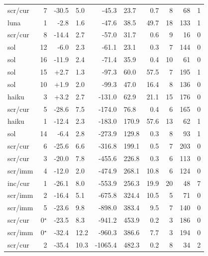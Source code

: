 \documentclass[11pt]{article}
\newcommand{\better}[1]{\textcolor{green!50!black}{#1}}
\newcommand{\worse}[1]{\textcolor{red!75!black}{#1}}
\begin{document}
\begin{table}
\begin{tabular}{l r r@{\,$\pm$\,}l r@{\,$\pm$\,}l r r r r}
scr/cur & 7 & \worse{-30.5} & \worse{5.0} & -45.3 & 23.7 & 0.7 & 8 & 68 & 1 \\
luna & 1 & -2.8 & 1.6 & -47.6 & 38.5 & 49.7 & 18 & 133 & 1 \\
scr/cur & 8 & \worse{-14.4} & \worse{2.7} & -57.0 & 31.7 & 0.6 & 9 & 16 & 0 \\
sol & 12 & \worse{-6.0} & \worse{2.3} & \worse{-61.1} & \worse{23.1} & 0.3 & 7 & 144 & 0 \\
sol & 16 & \worse{-11.9} & \worse{2.4} & -71.4 & 35.9 & 0.4 & 10 & 61 & 0 \\
sol & 15 & \better{+2.7} & \better{1.3} & -97.3 & 60.0 & 57.5 & 7 & 195 & 1 \\
sol & 10 & +1.9 & 2.0 & \worse{-99.3} & \worse{47.0} & 16.4 & 8 & 136 & 0 \\
haiku & 3 & +3.2 & 2.7 & \worse{-131.0} & \worse{62.9} & 21.1 & 15 & 176 & 0 \\
scr/cur & 5 & \worse{-28.6} & \worse{7.5} & \worse{-174.0} & \worse{76.8} & 0.4 & 6 & 165 & 0 \\
haiku & 1 & \worse{-12.4} & \worse{2.3} & -183.0 & 170.9 & 57.6 & 13 & 62 & 1 \\
sol & 14 & \worse{-6.4} & \worse{2.8} & \worse{-273.9} & \worse{129.8} & 0.3 & 8 & 93 & 1 \\
scr/cur & 6 & \worse{-25.6} & \worse{6.6} & -316.8 & 199.1 & 0.5 & 7 & 203 & 0 \\
scr/cur & 3 & \worse{-20.0} & \worse{7.8} & \worse{-455.6} & \worse{226.8} & 0.3 & 6 & 113 & 0 \\
scr/imm & 4 & \worse{-12.0} & \worse{2.0} & -474.9 & 268.1 & 10.8 & 6 & 124 & 0 \\
inc/cur & 1 & \worse{-26.1} & \worse{8.0} & \worse{-553.9} & \worse{256.3} & 19.9 & 20 & 48 & 7 \\
scr/imm & 2 & \worse{-16.4} & \worse{5.1} & \worse{-675.8} & \worse{324.4} & 10.5 & 5 & 71 & 0 \\
scr/imm & 5 & \worse{-23.6} & \worse{9.8} & \worse{-898.0} & \worse{383.4} & 9.5 & 7 & 140 & 0 \\
scr/cur & 0$^{\star}$ & \worse{-23.5} & \worse{8.3} & \worse{-941.2} & \worse{453.9} & 0.2 & 3 & 186 & 0 \\
scr/imm & 0$^{\star}$ & \worse{-32.4} & \worse{12.2} & \worse{-960.3} & \worse{386.6} & 7.7 & 3 & 194 & 0 \\
scr/cur & 2 & \worse{-35.4} & \worse{10.3} & \worse{-1065.4} & \worse{482.3} & 0.2 & 8 & 34 & 2 \\
\bottomrule
\end{tabular}

\end{table}
\end{document}

